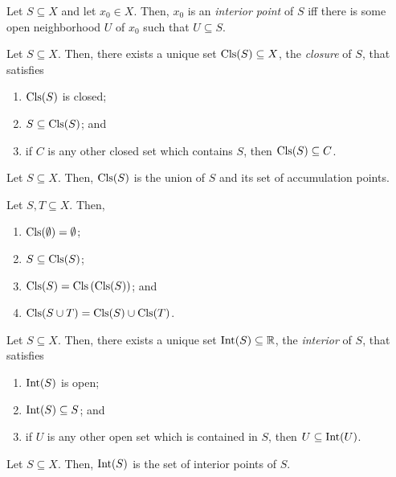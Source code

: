 \begin{dfn}
Let $S\subseteq X$ and let $x_0\in X$.  Then, $x_0$ is an \emph{interior point} of $S$ iff there is some open neighborhood $U$ of $x_0$ such that $U\subseteq S$.
\end{dfn}
\begin{prp}[Closure]\label{Closure}
Let $S\subseteq X$.  Then, there exists a unique set $\operatorname{Cls} (S)\subseteq X$, the \emph{closure} of $S$, that satisfies
\begin{enumerate}
\item $\operatorname{Cls} (S)$ is closed;
\item $S\subseteq \operatorname{Cls} (S)$; and
\item if $C$ is any other closed set which contains $S$, then $\operatorname{Cls} (S)\subseteq C$.
\end{enumerate}
\end{prp}
\begin{prp}
Let $S\subseteq X$.  Then, $\operatorname{Cls} (S)$ is the union of $S$ and its set of accumulation points.
\end{prp}
\begin{thm}
Let $S,T\subseteq X$.  Then,
\begin{enumerate}
\item $\operatorname{Cls} (\emptyset) =\emptyset$;
\item $S\subseteq \operatorname{Cls} (S)$;
\item $\operatorname{Cls} (S)=\operatorname{Cls} \left( \operatorname{Cls} (S)\right)$; and
\item $\operatorname{Cls} (S\cup T)=\operatorname{Cls} (S)\cup \operatorname{Cls} (T)$.
\end{enumerate}
\end{thm}
\begin{prp}[Interior]\label{Interior}
Let $S\subseteq X$.  Then, there exists a unique set $\operatorname{Int} (S)\subseteq \mathbb{R}$, the \emph{interior} of $S$, that satisfies
\begin{enumerate}
\item $\operatorname{Int} (S)$ is open;
\item $\operatorname{Int} (S)\subseteq S$; and
\item if $U$ is any other open set which is contained in $S$, then $U\subseteq \operatorname{Int} (U)$.
\end{enumerate}
\end{prp}
\begin{prp}
Let $S\subseteq X$.  Then, $\operatorname{Int} (S)$ is the set of interior points of $S$.
\end{prp}
